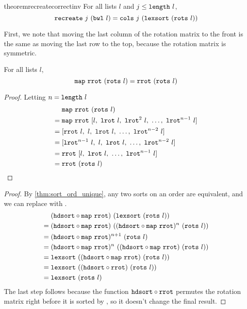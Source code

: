 \documentclass[sigplan,10pt,anonymous,review]{thesis}
\begin{document}
\begin{restatable*}{theorem}{recreatecorrectinv}
  For all lists $l$ and $j \le \texttt{\textup{length}}~l$,
  \begin{equation*}
  \texttt{\textup{recreate}}~j~(\texttt{\textup{bwl}}~l) = \texttt{\textup{cols}}~j~(\texttt{\textup{lexsort}}~(\texttt{\textup{rots}}~l))
  \end{equation*}
\end{restatable*}

First, we note that moving the last column of the rotation matrix to
the front is the same as moving the last row to the top, because the
rotation matrix is symmetric.
\begin{lemma}
  For all lists $l$,
  \begin{equation*}
    \texttt{\textup{map}}~\texttt{\textup{rrot}}~(\texttt{\textup{rots}}~l) = \texttt{\textup{rrot}}~(\texttt{\textup{rots}}~l)
  \end{equation*}
\end{lemma}
\begin{proof}
  Letting $n = \texttt{\textup{length}}~l$
  \begin{align*}
       &\texttt{\textup{map}}~\texttt{\textup{rrot}}~(\texttt{\textup{rots}}~l) \\
    ={}&\texttt{\textup{map}}~\texttt{\textup{rrot}}~[l,~\texttt{\textup{lrot}}~l,~\texttt{\textup{lrot}}^2~l,~\ldots,~\texttt{\textup{lrot}}^{n-1}~l] \\
    ={}&[\texttt{\textup{rrot}}~l,~l,~\texttt{\textup{lrot}}~l,~\ldots,~\texttt{\textup{lrot}}^{n-2}~l] \\
    ={}&[\texttt{\textup{lrot}}^{n-1}~l,~l,~\texttt{\textup{lrot}}~l,~\ldots,~\texttt{\textup{lrot}}^{n-2}~l] \\
    ={}&\texttt{\textup{rrot}}~[l,~\texttt{\textup{lrot}}~l,~\ldots,~\texttt{\textup{lrot}}^{n-1}~l] \\
    ={}&\texttt{\textup{rrot}}~(\texttt{\textup{rots}}~l) \qedhere
  \end{align*}
\end{proof}

\lexsortrotshdsort
\begin{proof}
  By \cref{thm:sort_ord_unique}, any two sorts on an order are
  equivalent, and we can replace  with .
  \begin{align*}
       &(\texttt{\textup{hdsort}} \circ \texttt{\textup{map}}~\texttt{\textup{rrot}})~(\texttt{\textup{lexsort}}~(\texttt{\textup{rots}}~l)) \\
    ={}&(\texttt{\textup{hdsort}} \circ \texttt{\textup{map}}~\texttt{\textup{rrot}})~((\texttt{\textup{hdsort}} \circ \texttt{\textup{map}}~\texttt{\textup{rrot}})^n~(\texttt{\textup{rots}}~l)) \\
    ={}&(\texttt{\textup{hdsort}} \circ \texttt{\textup{map}}~\texttt{\textup{rrot}})^{n+1}~(\texttt{\textup{rots}}~l) \\
    ={}&(\texttt{\textup{hdsort}} \circ \texttt{\textup{map}}~\texttt{\textup{rrot}})^n~((\texttt{\textup{hdsort}} \circ \texttt{\textup{map}}~\texttt{\textup{rrot}})~(\texttt{\textup{rots}}~l)) \\
    ={}&\texttt{\textup{lexsort}}~((\texttt{\textup{hdsort}} \circ \texttt{\textup{map}}~\texttt{\textup{rrot}})~(\texttt{\textup{rots}}~l)) \\
    ={}&\texttt{\textup{lexsort}}~((\texttt{\textup{hdsort}} \circ \texttt{\textup{rrot}})~(\texttt{\textup{rots}}~l)) \\
    ={}&\texttt{\textup{lexsort}}~(\texttt{\textup{rots}}~l)
  \end{align*}
  The last step follows because the function $\texttt{\textup{hdsort}} \circ
  \texttt{\textup{rrot}}$ permutes the rotation matrix right before it is sorted
  by , so it doesn't change the final result.
\end{proof}
\end{document}

